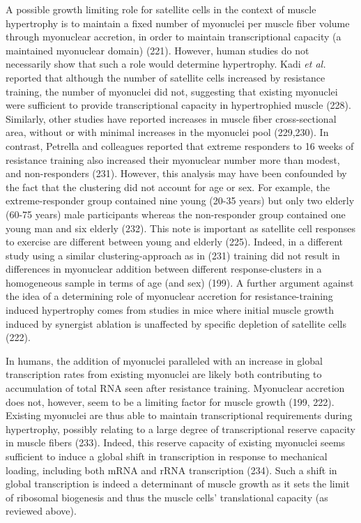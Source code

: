 \documentclass[twoside,10pt]{gihclass} %
\begin{document}
A possible growth limiting role for satellite cells in the context of muscle hypertrophy is to maintain a fixed number of myonuclei per muscle fiber volume through myonuclear accretion, in order to maintain transcriptional capacity (a maintained myonuclear domain)
(221).
However, human studies do not necessarily show that such a role would determine hypertrophy.
Kadi \emph{et al.} reported that although the number of satellite cells increased by resistance training, the number of myonuclei did not,
suggesting that existing myonuclei were sufficient to provide transcriptional capacity in hypertrophied muscle
(228).
Similarly, other studies have reported increases in muscle fiber cross-sectional area, without or with minimal increases in the myonuclei pool
(229,230).
In contrast, Petrella and colleagues reported that extreme responders to 16 weeks of resistance training also increased their myonuclear number more than modest, and non-responders
(231).
However, this analysis may have been confounded by the fact that the clustering did not account for age or sex. For example, the extreme-responder group contained nine young (20-35 years) but only two elderly (60-75 years) male participants whereas the non-responder group contained one young man and six elderly
(232).
This note is important as satellite cell responses to exercise are different between young and elderly
(225).
Indeed, in a different study using a similar clustering-approach as in (231) training did not result in differences in myonuclear addition between different response-clusters in a homogeneous sample in terms of age (and sex)
(199).
A further argument against the idea of a determining role of myonuclear accretion for resistance-training induced hypertrophy comes from studies in mice where initial muscle growth induced by synergist ablation is unaffected by specific depletion of satellite cells
(222).

In humans, the addition of myonuclei paralleled with an increase in global transcription rates from existing myonuclei are likely both contributing to accumulation of total RNA seen after resistance training.
Myonuclear accretion does not, however, seem to be a limiting factor for muscle growth
(199, 222).
Existing myonuclei are thus able to maintain transcriptional requirements during hypertrophy, possibly relating to a large degree of transcriptional reserve capacity in muscle fibers
(233).
Indeed, this reserve capacity of existing myonuclei seems sufficient to induce a global shift in transcription in response to mechanical loading, including both mRNA and rRNA transcription
(234).
Such a shift in global transcription is indeed a determinant of muscle growth as it sets the limit of ribosomal biogenesis and thus the muscle cells' translational capacity (as reviewed above).
\end{document}
